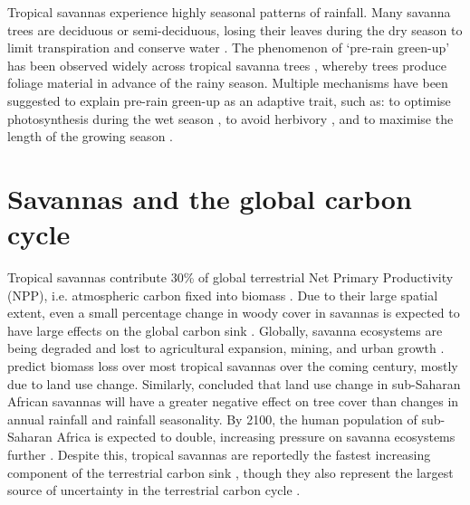 \begin{refsection}
Tropical savannas experience highly seasonal patterns of rainfall. Many savanna trees are deciduous or semi-deciduous, losing their leaves during the dry season to limit transpiration and conserve water \citep{Dahlin2016}. The phenomenon of `pre-rain green-up' has been observed widely across tropical savanna trees \citep{Archibald2007, Borchert1994, Williams1997, Ryan2017}, whereby trees produce foliage material in advance of the rainy season. Multiple mechanisms have been suggested to explain pre-rain green-up as an adaptive trait, such as: to optimise photosynthesis during the wet season \citep{Archibald2007}, to avoid herbivory \citep{Aide1988}, and to maximise the length of the growing season \citep{Scholes1993}. 

\section{Savannas and the global carbon cycle}
\label{background:ssec:carbon}

Tropical savannas contribute \textapprox{}30\% of global terrestrial Net Primary Productivity (NPP), i.e. atmospheric carbon fixed into biomass \citep{Grace2006}. Due to their large spatial extent, even a small percentage change in woody cover in savannas is expected to have large effects on the global carbon sink \citep{Williams2005}. Globally, savanna ecosystems are being degraded and lost to agricultural expansion, mining, and urban growth \citep{Parr2014}. \citet{Ross2021} predict biomass loss over most tropical savannas over the coming century, mostly due to land use change. Similarly, \citet{Aleman2016} concluded that land use change in sub-Saharan African savannas will have a greater negative effect on tree cover than changes in annual rainfall and rainfall seasonality. By 2100, the human population of sub-Saharan Africa is expected to double, increasing pressure on savanna ecosystems further \citep{Pison2017}. Despite this, tropical savannas are reportedly the fastest increasing component of the terrestrial carbon sink \citep{Sitch2015}, though they also represent the largest source of uncertainty in the terrestrial carbon cycle \citep{Ahlstrom2015}.


\end{refsection}
